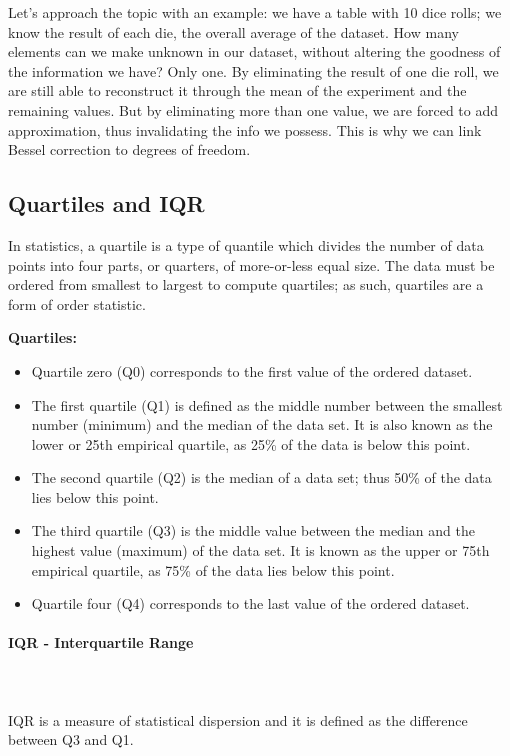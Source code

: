 \documentclass{article}
\begin{document}
Let's approach the topic with an example: we have a table with 10 dice rolls; we know the result of each die, the overall average of the dataset.
How many elements can we make unknown in our dataset, without altering the goodness of the information we have?
Only one. By eliminating the result of one die roll, we are still able to reconstruct it through the mean of the experiment and the remaining values.
But by eliminating more than one value, we are forced to add approximation, thus invalidating the info we possess.
This is why we can link Bessel correction to degrees of freedom. 

\subsection{Quartiles and IQR}
In statistics, a quartile is a type of quantile which divides the number of data points into four parts, or quarters, of more-or-less equal size. The data must be ordered from smallest to largest to compute quartiles; as such, quartiles are a form of order statistic. 

\textbf{Quartiles:}
\begin{itemize}
    \item Quartile zero (Q0) corresponds to the first value of the ordered dataset.
    \item The first quartile (Q1) is defined as the middle number between the smallest number (minimum) and the median of the data set. It is also known as the lower or 25th empirical quartile, as 25\% of the data is below this point.
    \item The second quartile (Q2) is the median of a data set; thus 50\% of the data lies below this point.
    \item The third quartile (Q3) is the middle value between the median and the highest value (maximum) of the data set. It is known as the upper or 75th empirical quartile, as 75\% of the data lies below this point.
    \item Quartile four (Q4) corresponds to the last value of the ordered dataset.
\end{itemize}

\paragraph{IQR - Interquartile Range}\mbox{} \\
\mbox{} \\
IQR is a measure of statistical dispersion and it is defined as the difference between Q3 and Q1.
\end{document}
